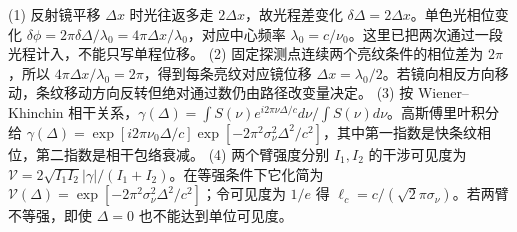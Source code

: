 (1) 反射镜平移 \(\Delta x\) 时光往返多走 \(2\Delta x\)，故光程差变化 \(\delta\Delta=2\Delta x\)。单色光相位变化 \(\delta\phi=2\pi\delta\Delta/\lambda_0=4\pi\Delta x/\lambda_0\)，对应中心频率 \(\lambda_0=c/\nu_0\)。这里已把两次通过一段光程计入，不能只写单程位移。
(2) 固定探测点连续两个亮纹条件的相位差为 \(2\pi\)，所以 \(4\pi\Delta x/\lambda_0=2\pi\)，得到每条亮纹对应镜位移 \(\Delta x=\lambda_0/2\)。若镜向相反方向移动，条纹移动方向反转但绝对通过数仍由路径改变量决定。
(3) 按 Wiener–Khinchin 相干关系，\(\gamma(\Delta)=\int S(\nu)e^{i2\pi\nu\Delta/c}d\nu/\int S(\nu)d\nu\)。高斯傅里叶积分给 \(\gamma(\Delta)=\exp[i2\pi\nu_0\Delta/c]\exp[-2\pi^2\sigma_\nu^2\Delta^2/c^2]\)，其中第一指数是快条纹相位，第二指数是相干包络衰减。
(4) 两个臂强度分别 \(I_1,I_2\) 的干涉可见度为 \(\mathcal V=2\sqrt{I_1I_2}|\gamma|/(I_1+I_2)\)。在等强条件下它化简为 \(\mathcal V(\Delta)=\exp[-2\pi^2\sigma_\nu^2\Delta^2/c^2]\)；令可见度为 \(1/e\) 得 \(\ell_c=c/(\sqrt2\pi\sigma_\nu)\)。若两臂不等强，即使 \(\Delta=0\) 也不能达到单位可见度。
